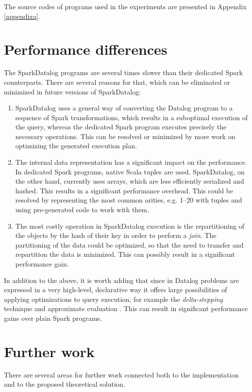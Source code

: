 The source codes of programs used in the experiments are presented in Appendix \ref{appendixa}.

\section{Performance differences}\label{s:whyslow}
The SparkDatalog programs are several times slower than their dedicated Spark counterparts. There are several reasons for that, which can be eliminated or minimized in future versions of SparkDatalog:
\begin{enumerate}
\item SparkDatalog uses a general way of converting the Datalog program to a sequence of Spark transformations, which results in a suboptimal execution of the query, whereas the dedicated Spark program executes precisely the necessary operations. This can be resolved or minimized by more work on optimizing the generated execution plan.
\item The internal data representation has a significant impact on the performance. In dedicated Spark programs, native Scala tuples are used. SparkDatalog, on the other hand, currently uses arrays, which are less efficiently serialized and hashed. This results in a significant performance overhead. This could be resolved by representing the most common arities, e.g. 1--20 with tuples and using pre-generated code to work with them.
\item The most costly operation in SparkDatalog execution is the repartitioning of the objects by the hash of their key in order to perform a \emph{join}. The partitioning of the data could be optimized, so that the need to transfer and repartition the data is minimized. This can possibly result in a significant performance gain.
\end{enumerate}

In addition to the above, it is worth adding that since in Datalog problems are expressed in a very high-level, declarative way it offers large possibilities of applying optimizations to query execution, for example the \emph{delta-stepping} technique and approximate evaluation \cite{distsoc}. This can result in significant performance gains over plain Spark programs.

\section{Further work}

There are several areas for further work connected both to the implementation and to the proposed theoretical solution.


